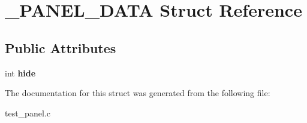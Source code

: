 \hypertarget{struct___p_a_n_e_l___d_a_t_a}{}\section{\+\_\+\+P\+A\+N\+E\+L\+\_\+\+D\+A\+TA Struct Reference}
\label{struct___p_a_n_e_l___d_a_t_a}
\subsection*{Public Attributes}
\begin{DoxyCompactItemize}
\item 
\mbox{\label{struct___p_a_n_e_l___d_a_t_a_a462fbda39cf0de1a64f7116fd7342463}} 
int {\bfseries hide}
\end{DoxyCompactItemize}


The documentation for this struct was generated from the following file\+:\begin{DoxyCompactItemize}
\item 
test\+\_\+panel.\+c\end{DoxyCompactItemize}

